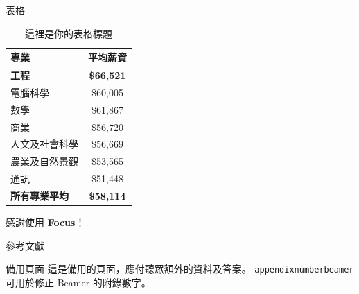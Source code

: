 \documentclass[hyperref={bookmarks=false}]{beamer}
\begin{document}

\begin{frame}{\iyan 表格}
  \begin{table}
    \centering %
    \begin{tabular}{l c}
      \toprule
      專業 & 平均薪資 \\
      \toprule
      \textbf{工程} & \textbf{\$66,521} \\
      電腦科學 & \$60,005\\
      數學 & \$61,867\\
      商業 & \$56,720\\
      人文及社會科學 & \$56,669\\
      農業及自然景觀 & \$53,565\\
      通訊 & \$51,448\\
      \midrule
      \textbf{所有專業平均} & \textbf{\$58,114}\\
      \bottomrule
    \end{tabular}
  \caption{這裡是你的表格標題}
  \end{table}
\end{frame}


\begin{frame}[focus]
  {\iyan 感謝使用 \textbf{Focus}！}
\end{frame}


\appendix

\begin{frame}{\iyan 參考文獻}
  \nocite{*} %
  
  
\end{frame}


\begin{frame}{\iyan 備用頁面}
  這是備用的頁面，應付聽眾額外的資料及答案。
  \vfill
   \texttt{appendixnumberbeamer} 可用於修正 Beamer 的附錄數字。
\end{frame}

\end{document}
